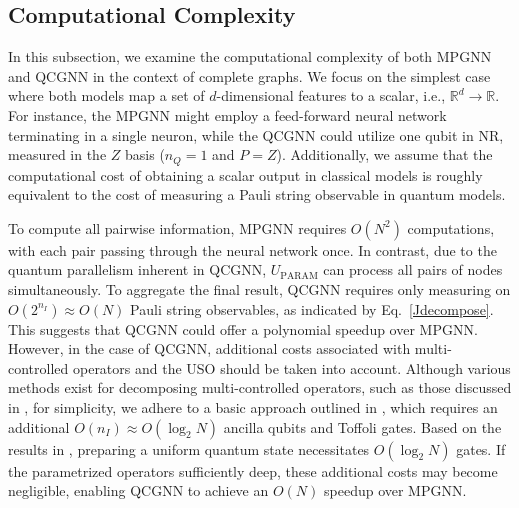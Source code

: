 \documentclass[reprint,amsmath,amssymb,prd,nofootinbib]{revtex4-2}
\def\xbf{\mathbf{x}}
\def\thetabf{\boldsymbol{\theta}}
\def\UPARAM{U_{\text{PARAM}}}
\begin{document}

\subsection{Computational Complexity} \label{sec_complexity}

In this subsection, we examine the computational complexity of both MPGNN and QCGNN in the context of complete graphs. We focus on the simplest case where both models map a set of $d$-dimensional features to a scalar, i.e., $\mathbb{R}^d\rightarrow\mathbb{R}$. For instance, the MPGNN might employ a feed-forward neural network terminating in a single neuron, while the QCGNN could utilize one qubit in NR, measured in the $Z$ basis ($n_Q=1$ and $P=Z$). Additionally, we assume that the computational cost of obtaining a scalar output in classical models is roughly equivalent to the cost of measuring a Pauli string observable in quantum models.

To compute all pairwise information, MPGNN requires $O(N^2)$ computations, with each pair passing through the neural network once. In contrast, due to the quantum parallelism inherent in QCGNN, $\UPARAM$ can process all pairs of nodes simultaneously. To aggregate the final result, QCGNN requires only measuring on $O(2^{n_I}) \approx O(N)$ Pauli string observables, as indicated by Eq.~\ref{Jdecompose}. This suggests that QCGNN could offer a polynomial speedup over MPGNN. However, in the case of QCGNN, additional costs associated with multi-controlled operators and the USO should be taken into account. Although various methods exist for decomposing multi-controlled operators, such as those discussed in \cite{q_decomp1,q_decomp2,q_decomp3}, for simplicity, we adhere to a basic approach outlined in \cite{NC}, which requires an additional $O(n_I)\approx O(\log_2 N)$ ancilla qubits and Toffoli gates. Based on the results in \cite{uso1,uso2}, preparing a uniform quantum state necessitates $O(\log_2 N)$ gates. If the parametrized operators sufficiently deep, these additional costs may become negligible, enabling QCGNN to achieve an $O(N)$ speedup over MPGNN.
\end{document}
